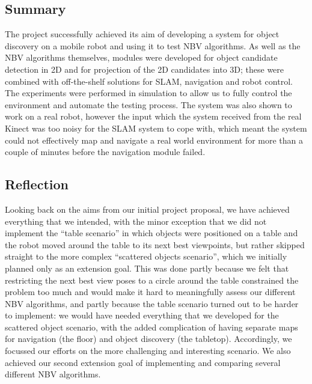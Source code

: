 

\subsection{Summary}

The project successfully achieved its aim of developing a system for object discovery on a mobile robot and using it to test NBV algorithms.
As well as the NBV algorithms themselves, modules were developed for object candidate detection in 2D and for projection of the 2D candidates into 3D; these were combined with off-the-shelf solutions for SLAM, navigation and robot control.
The experiments were performed in simulation to allow us to fully control the environment and automate the testing process.
The system was also shown to work on a real robot, however the input which the system received from the real Kinect was too noisy for the SLAM system to cope with, which meant the system could not effectively map and navigate a real world environment for more than a couple of minutes before the navigation module failed.

\subsection{Reflection}
\label{ssec:reflection}

Looking back on the aims from our initial project proposal, we have achieved everything that we intended, with the minor exception that we did not implement the ``table scenario'' in which objects were positioned on a table and the robot moved around the table to its next best viewpoints, but rather skipped straight to the more complex ``scattered objects scenario'', which we initially planned only as an extension goal.
This was done partly because we felt that restricting the next best view poses to a circle around the table constrained the problem too much and would make it hard to meaningfully assess our different NBV algorithms, and partly because the table scenario turned out to be harder to implement: we would have needed everything that we developed for the scattered object scenario, with the added complication of having separate maps for navigation (the floor) and object discovery (the tabletop).
Accordingly, we focussed our efforts on the more challenging and interesting scenario.
We also achieved our second extension goal of implementing and comparing several different NBV algorithms.

